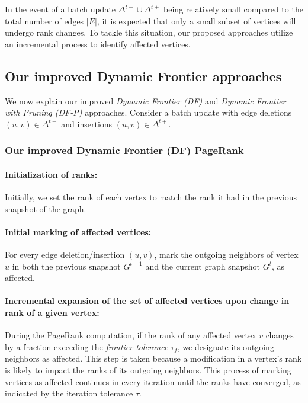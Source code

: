 In the event of a batch update $\Delta^{t-} \cup \Delta^{t+}$ being relatively small compared to the total number of edges $|E|$, it is expected that only a small subset of vertices will undergo rank changes. To tackle this situation, our proposed approaches utilize an incremental process to identify affected vertices.




\subsection{Our improved Dynamic Frontier approaches}
\label{sec:frontier}

We now explain our improved \textit{Dynamic Frontier (DF)} and \textit{Dynamic Frontier with Pruning (DF-P)} approaches. Consider a batch update with edge deletions $(u, v) \in \Delta^{t-}$ and insertions $(u, v) \in \Delta^{t+}$.


\subsubsection{Our improved Dynamic Frontier (DF) PageRank}

\paragraph{Initialization of ranks:}

Initially, we set the rank of each vertex to match the rank it had in the previous snapshot of the graph.

\paragraph{Initial marking of affected vertices:}

For every edge deletion/insertion $(u, v)$, mark the outgoing neighbors of vertex $u$ in both the previous snapshot $G^{t-1}$ and the current graph snapshot $G^t$, as affected.

\paragraph{Incremental expansion of the set of affected vertices upon change in rank of a given vertex:}

During the PageRank computation, if the rank of any affected vertex $v$ changes by a fraction exceeding the \textit{frontier tolerance} $\tau_f$, we designate its outgoing neighbors as affected. This step is taken because a modification in a vertex's rank is likely to impact the ranks of its outgoing neighbors. This process of marking vertices as affected continues in every iteration until the ranks have converged, as indicated by the iteration tolerance $\tau$.



